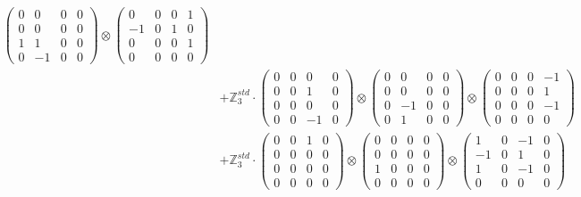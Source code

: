 \documentclass{article}
\begin{document}
{\begin{align}
            \begin{pmatrix} 0 & 0 & 0 & 0 \\ 0 & 0 & 0 & 0 \\ 1 & 1 & 0 & 0 \\ 0 & -1 & 0 & 0 \end{pmatrix} \otimes 
            \begin{pmatrix} 0 & 0 & 0 & 1 \\ -1 & 0 & 1 & 0 \\ 0 & 0 & 0 & 1 \\ 0 & 0 & 0 & 0 \end{pmatrix} \\ 
        &+ \label{Rs16-Rc11-Solution-20-c20} \mathbb{Z}_3^{std} \cdot 
            \begin{pmatrix} 0 & 0 & 0 & 0 \\ 0 & 0 & 1 & 0 \\ 0 & 0 & 0 & 0 \\ 0 & 0 & -1 & 0 \end{pmatrix} \otimes 
            \begin{pmatrix} 0 & 0 & 0 & 0 \\ 0 & 0 & 0 & 0 \\ 0 & -1 & 0 & 0 \\ 0 & 1 & 0 & 0 \end{pmatrix} \otimes 
            \begin{pmatrix} 0 & 0 & 0 & -1 \\ 0 & 0 & 0 & 1 \\ 0 & 0 & 0 & -1 \\ 0 & 0 & 0 & 0 \end{pmatrix} \\ 
        &+ \label{Rs16-Rc11-Solution-20-c21} \mathbb{Z}_3^{std} \cdot 
            \begin{pmatrix} 0 & 0 & 1 & 0 \\ 0 & 0 & 0 & 0 \\ 0 & 0 & 0 & 0 \\ 0 & 0 & 0 & 0 \end{pmatrix} \otimes 
            \begin{pmatrix} 0 & 0 & 0 & 0 \\ 0 & 0 & 0 & 0 \\ 1 & 0 & 0 & 0 \\ 0 & 0 & 0 & 0 \end{pmatrix} \otimes 
            \begin{pmatrix} 1 & 0 & -1 & 0 \\ -1 & 0 & 1 & 0 \\ 1 & 0 & -1 & 0 \\ 0 & 0 & 0 & 0 \end{pmatrix} \\ 

\end{align}}
\end{document}

